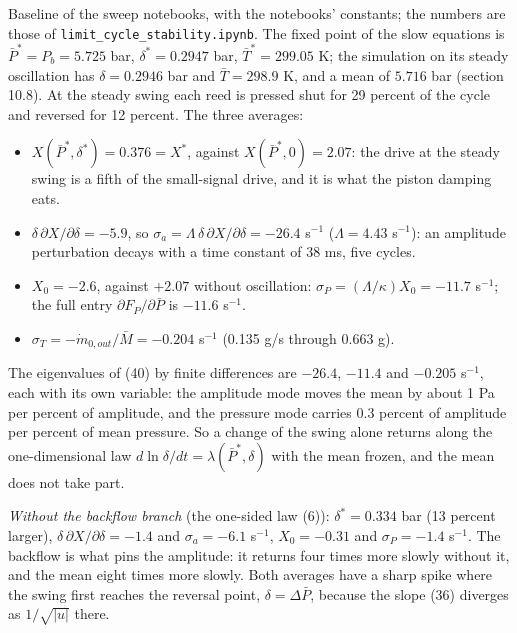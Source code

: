 Baseline of the sweep notebooks, with the notebooks' constants; the numbers are those of \texttt{limit\_\allowbreak cycle\_\allowbreak stability.ipynb}. The fixed point of the slow equations is $\bar P^* = P_b = 5.725$ bar, $\delta^* = 0.2947$ bar, $\bar T^* = 299.05$ K; the simulation on its steady oscillation has $\delta = 0.2946$ bar and $\bar T = 298.9$ K, and a mean of $5.716$ bar (section 10.8). At the steady swing each reed is pressed shut for 29 percent of the cycle and reversed for 12 percent. The three averages:
\begin{itemize}
\item $X(\bar P^*, \delta^*) = 0.376 = X^*$, against $X(\bar P^*, 0) = 2.07$: the drive at the steady swing is a fifth of the small-signal drive, and it is what the piston damping eats.
\item $\delta\,\partial X/\partial\delta = -5.9$, so $\sigma_a = \Lambda\,\delta\,\partial X/\partial\delta = -26.4$ s$^{-1}$ ($\Lambda = 4.43$ s$^{-1}$): an amplitude perturbation decays with a time constant of 38 ms, five cycles.
\item $X_0 = -2.6$, against $+2.07$ without oscillation: $\sigma_P = (\Lambda/\kappa)X_0 = -11.7$ s$^{-1}$; the full entry $\partial F_P/\partial\bar P$ is $-11.6$ s$^{-1}$.
\item $\sigma_T = -\dot m_{0,out}/\bar M = -0.204$ s$^{-1}$ (0.135 g/s through 0.663 g).
\end{itemize}
The eigenvalues of (40) by finite differences are $-26.4$, $-11.4$ and $-0.205$ s$^{-1}$, each with its own variable: the amplitude mode moves the mean by about 1 Pa per percent of amplitude, and the pressure mode carries 0.3 percent of amplitude per percent of mean pressure. So a change of the swing alone returns along the one-dimensional law $d\ln\delta/dt = \lambda(\bar P^*, \delta)$ with the mean frozen, and the mean does not take part.

\emph{Without the backflow branch} (the one-sided law (6)): $\delta^* = 0.334$ bar (13 percent larger), $\delta\,\partial X/\partial\delta = -1.4$ and $\sigma_a = -6.1$ s$^{-1}$, $X_0 = -0.31$ and $\sigma_P = -1.4$ s$^{-1}$. The backflow is what pins the amplitude: it returns four times more slowly without it, and the mean eight times more slowly. Both averages have a sharp spike where the swing first reaches the reversal point, $\delta = \Delta\bar P$, because the slope (36) diverges as $1/\sqrt{\lvert u\rvert}$ there.

